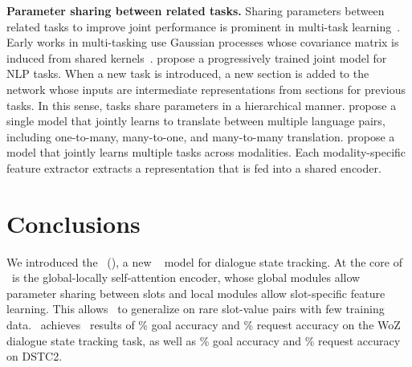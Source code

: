 \documentclass[11pt,a4paper]{article}
\begin{document}
\textbf{Parameter sharing between related tasks.}
Sharing parameters between related tasks to improve joint performance is prominent in multi-task learning~\cite{caruana1998multitask,thrun1996learning}.
Early works in multi-tasking use Gaussian processes whose covariance matrix is induced from shared kernels~\cite{lawrence2004learning,yu2005learning,seeger2005semiparametric,bonilla2008multi}.
\citet{Hashimoto2017joint} propose a progressively trained joint model for NLP tasks.
When a new task is introduced, a new section is added to the network whose inputs are intermediate representations from sections for previous tasks.
In this sense, tasks share parameters in a hierarchical manner.
\citet{johnson2016google} propose a single model that jointly learns to translate between multiple language pairs, including one-to-many, many-to-one, and many-to-many translation.
\citet{kaiser2017one} propose a model that jointly learns multiple tasks across modalities.
Each modality-specific feature extractor extracts a representation that is fed into a shared encoder.
















\section{Conclusions}
We introduced the \modelname~(\modelnameshort), a new \sota~ model for dialogue state tracking.
At the core of \modelnameshort~is the global-locally self-attention encoder, whose global modules allow parameter sharing between slots and local modules allow slot-specific feature learning.
This allows \modelnameshort~to generalize on rare slot-value pairs with few training data.
\modelnameshort~achieves \sota~results of \goalacc\% goal accuracy and \requestacc\% request accuracy on the WoZ dialogue state tracking task, as well as \dstcgoalacc\% goal accuracy and \dstcrequestacc\% request accuracy on DSTC2.
\end{document}
